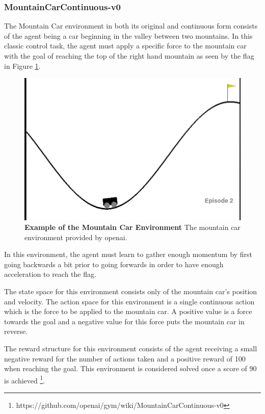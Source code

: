 \documentclass[conference]{IEEEtran}
\begin{document}
\subsubsection{MountainCarContinuous-v0}
The Mountain Car environment in both its original and continuous form consists of the agent being a car beginning in the valley between two mountains.
In this classic control task, the agent must apply a specific force to the mountain car with the goal of reaching the top of the right hand mountain as seen by the flag in Figure \ref{fig:mountainCarEnvironment}.

\begin{figure}[htbp]
\centerline{\includegraphics[scale=0.5]{mountain_car.png}}
\caption{\textbf{Example of the Mountain Car Environment}  The mountain car environment provided by openai.}
\label{fig:mountainCarEnvironment}
\end{figure}

In this environment, the agent must learn to gather enough momentum by first going backwards a bit prior to going forwards in order to have enough acceleration to reach the flag.

The state space for this environment consists only of the mountain car's position and velocity.
The action space for this environment is a single continuous action which is the force to be applied to the mountain car.
A positive value is a force towards the goal and a negative value for this force puts the mountain car in reverse.

The reward structure for this environment consists of the agent receiving a small negative reward for the number of actions taken and a positive reward of 100 when reaching the goal.
This environment is considered solved once a score of 90 is achieved \footnote{https://github.com/openai/gym/wiki/MountainCarContinuous-v0}.
\end{document}
